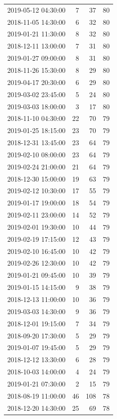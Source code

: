 \begin{tabular}{lrrr}
2019-05-12 04:30:00 & 7 & 37 & 80 \\
2018-11-05 14:30:00 & 6 & 32 & 80 \\
2019-01-21 11:30:00 & 8 & 32 & 80 \\
2018-12-11 13:00:00 & 7 & 31 & 80 \\
2019-01-27 09:00:00 & 8 & 31 & 80 \\
2018-11-26 15:30:00 & 8 & 29 & 80 \\
2019-04-17 20:30:00 & 6 & 29 & 80 \\
2019-03-02 23:45:00 & 5 & 24 & 80 \\
2019-03-03 18:00:00 & 3 & 17 & 80 \\
2018-11-10 04:30:00 & 22 & 70 & 79 \\
2019-01-25 18:15:00 & 23 & 70 & 79 \\
2018-12-31 13:45:00 & 23 & 64 & 79 \\
2019-02-10 08:00:00 & 23 & 64 & 79 \\
2019-02-24 21:00:00 & 21 & 64 & 79 \\
2018-12-30 15:00:00 & 19 & 63 & 79 \\
2019-02-12 10:30:00 & 17 & 55 & 79 \\
2019-01-17 19:00:00 & 18 & 54 & 79 \\
2019-02-11 23:00:00 & 14 & 52 & 79 \\
2019-02-01 19:30:00 & 10 & 44 & 79 \\
2019-02-19 17:15:00 & 12 & 43 & 79 \\
2019-02-10 16:45:00 & 10 & 42 & 79 \\
2019-02-26 12:30:00 & 10 & 42 & 79 \\
2019-01-21 09:45:00 & 10 & 39 & 79 \\
2019-01-15 14:15:00 & 9 & 38 & 79 \\
2018-12-13 11:00:00 & 10 & 36 & 79 \\
2019-03-03 14:30:00 & 9 & 36 & 79 \\
2018-12-01 19:15:00 & 7 & 34 & 79 \\
2018-09-20 17:30:00 & 5 & 29 & 79 \\
2019-01-07 19:45:00 & 5 & 29 & 79 \\
2018-12-12 13:30:00 & 6 & 28 & 79 \\
2018-10-03 14:00:00 & 4 & 24 & 79 \\
2019-01-21 07:30:00 & 2 & 15 & 79 \\
2018-08-19 11:00:00 & 46 & 108 & 78 \\
2018-12-20 14:30:00 & 25 & 69 & 78 \\

\end{tabular}
